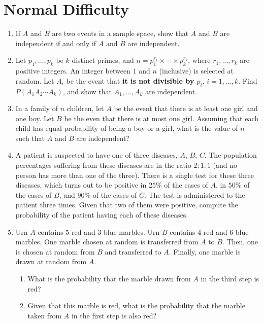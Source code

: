 \documentclass[svgnames]{amsart}
\begin{document}
\section{Normal Difficulty}
\begin{enumerate}
\item If $A$ and $B$ are two events in a sample space, show that $A$ and $B$ are independent if and only if $A$ and $\overline B$ are independent.

\item Let $p_1, \ldots, p_k$ be $k$ distinct primes, and $n = p_1^{r_1} \times \cdots \times p_k^{r_k}$, where $r_1, \ldots, r_k$ are positive integers. An integer between $1$ and $n$ (inclusive) is selected at random. Let $A_i$ be the event that \textbf{it is not divisible by $p_i$}, $i = 1, \ldots, k$. Find $P(A_1 A_2 \cdots A_k)$, and show that $A_1, \ldots, A_k$ are independent.

\item In a family of $n$ children, let $A$ be the event that there is at least one girl and one boy. Let $B$ be the even that there is at most one girl. Assuming that each child has equal probability of being a boy or a girl, what is the value of $n$ such that $A$ and $B$ are independent?

\item A patient is suspected to have one of three diseases, $A$, $B$, $C$. The population percentages suffering from these diseases are in the ratio $2:1:1$ (and no person has more than one of the three). There is a single test for these three diseases, which turns out to be positive in $25\%$ of the cases of $A$, in $50\%$ of the cases of $B$, and $90\%$ of the cases of $C$. The test is administered to the patient three times. Given that two of them were positive, compute the probability of the patient having each of these diseases.

\item Urn $A$ contains $5$ red and $3$ blue marbles. Urn $B$ contains $4$ red and $6$ blue marbles. One marble chosen at random is transferred from $A$ to $B$. Then, one is chosen at random from $B$ and transferred to $A$. Finally, one marble is drawn at random from $A$.
\begin{enumerate}
	\item What is the probability that the marble drawn from $A$ in the third step is red?
	\item Given that this marble is red, what is the probability that the marble taken from $A$ in the first step is also red?
\end{enumerate}
\end{enumerate} %
\end{document}
